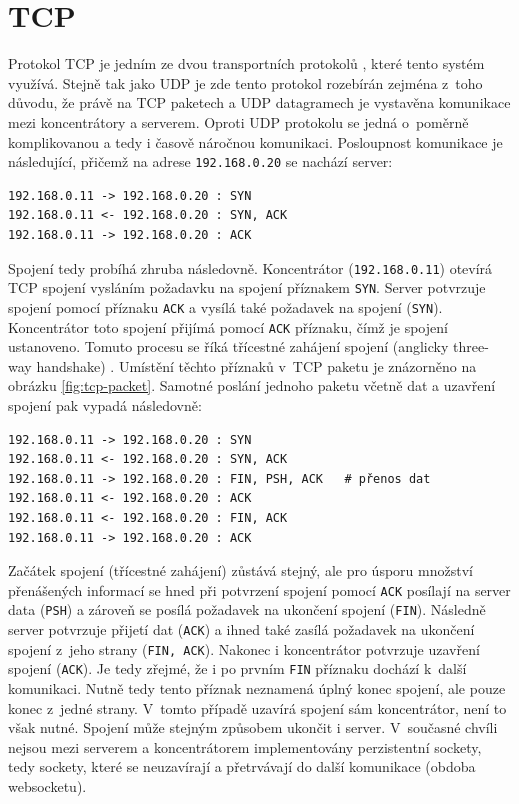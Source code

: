 \section{TCP}
Protokol TCP  je jedním ze dvou transportních protokolů \cite{mistrovstvi}, které tento systém využívá. Stejně tak jako UDP je zde tento protokol rozebírán zejména z~toho důvodu, že právě na TCP paketech a UDP datagramech je vystavěna komunikace mezi koncentrátory a serverem. Oproti UDP protokolu se jedná o~poměrně komplikovanou a tedy i časově náročnou komunikaci. Posloupnost komunikace je následující, přičemž na adrese \texttt{192.168.0.20} se  nachází server:

\begin{verbatim}
192.168.0.11 -> 192.168.0.20 : SYN
192.168.0.11 <- 192.168.0.20 : SYN, ACK
192.168.0.11 -> 192.168.0.20 : ACK
\end{verbatim}

Spojení tedy probíhá zhruba následovně. Koncentrátor (\texttt{192.168.0.11}) otevírá TCP spojení vysláním požadavku na spojení příznakem \texttt{SYN}. Server potvrzuje spojení pomocí příznaku \texttt{ACK} a vysílá také požadavek na spojení (\texttt{SYN}). Koncentrátor toto spojení přijímá pomocí \texttt{ACK} příznaku, čímž je spojení ustanoveno. Tomuto procesu se říká třícestné zahájení spojení  (anglicky three-way handshake) \cite{mistrovstvi}. Umístění těchto příznaků v~TCP paketu je znázorněno na obrázku \ref{fig:tcp-packet}. Samotné poslání jednoho paketu včetně dat a uzavření spojení pak vypadá následovně:

\begin{verbatim}
192.168.0.11 -> 192.168.0.20 : SYN
192.168.0.11 <- 192.168.0.20 : SYN, ACK
192.168.0.11 -> 192.168.0.20 : FIN, PSH, ACK   # přenos dat
192.168.0.11 <- 192.168.0.20 : ACK
192.168.0.11 <- 192.168.0.20 : FIN, ACK
192.168.0.11 -> 192.168.0.20 : ACK
\end{verbatim}

Začátek spojení (třícestné zahájení) zůstává stejný, ale pro úsporu množ\-ství přenášených informací se hned při potvrzení spojení pomocí \texttt{ACK} posílají na server data (\texttt{PSH}) a zároveň se posílá požadavek na ukončení spojení (\texttt{FIN}). Následně server potvrzuje přijetí dat (\texttt{ACK}) a ihned také zasílá požadavek na ukončení spojení z~jeho strany (\texttt{FIN, ACK}). Nakonec i koncentrátor potvrzuje uzavření spojení (\texttt{ACK}). Je tedy zřejmé, že i po prvním \texttt{FIN} příznaku dochází k~další komunikaci. Nutně tedy tento příznak neznamená úplný konec spojení, ale pouze konec z~jedné strany. V~tomto případě uzavírá spojení sám koncentrátor, není to však nutné. Spojení může stejným způsobem ukončit i server. V~současné chvíli nejsou mezi serverem a koncentrátorem implementovány perzistentní sockety, tedy sockety, které se neuzavírají a přetrvávají do další komunikace (obdoba websocketu).


